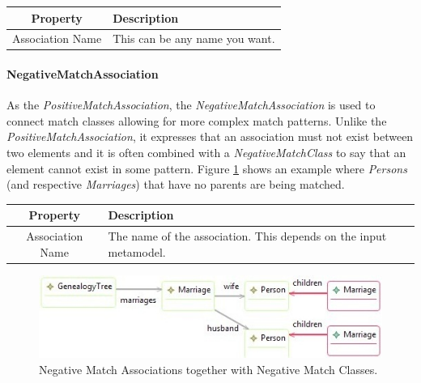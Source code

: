 \begin{center}
  \begin{tabular}{ | c | p{\paragraphsize} | }
    \hline
    \textbf{Property} & \textbf{Description} \\ \hline
    Association Name & This can be any name you want.  \\
    \hline
  \end{tabular}
\end{center}


\paragraph{NegativeMatchAssociation}

As the \emph{PositiveMatchAssociation}, the \emph{NegativeMatchAssociation} is
used to connect match classes allowing for more complex match patterns. Unlike
the \emph{PositiveMatchAssociation}, it expresses that an association must not
exist between two elements and it is often combined with a
\emph{NegativeMatchClass} to say that an element cannot exist in some pattern.
Figure \ref{fig:negative_match_class_and_assoc} shows an example where
\emph{Persons} (and respective \emph{Marriages}) that have no parents are being
matched.

\begin{center}
  \begin{tabular}{ | c | p{\paragraphsize} | }
    \hline
    \textbf{Property} & \textbf{Description} \\ \hline
    Association Name & The name of the association. This depends on the input
  metamodel.  \\
    \hline
  \end{tabular}
\end{center}

\begin{figure}[h]
\begin{center}
  \includegraphics[scale=0.7]{imgs/negative_match_class_and_assoc.jpg}
  \caption{Negative Match Associations together with Negative Match Classes.}
  \label{fig:negative_match_class_and_assoc}
\end{center}
\end{figure}



